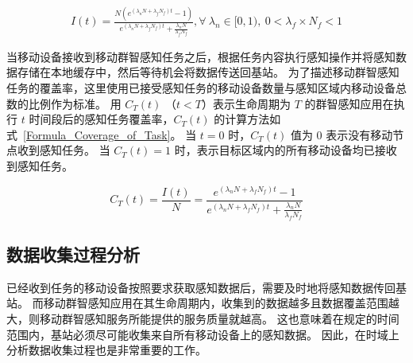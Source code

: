 \begin{equation}
\label{Formula_It_with_fog}
\begin{aligned}
I(t) = \frac{N (e^{(\lambda_n N + \lambda_f N_f) t} - 1)}{e^{(\lambda_n N + \lambda_f N_f) t} + \frac{\lambda_n N}{\lambda_f N_f}}, \forall\ \lambda_n \in [0, 1),\ 0 < \lambda_f \times N_f < 1
\end{aligned}
\end{equation}

当移动设备接收到移动群智感知任务之后，根据任务内容执行感知操作并将感知数据存储在本地缓存中，然后等待机会将数据传送回基站。
为了描述移动群智感知任务的覆盖率，这里使用已接受感知任务的移动设备数量与感知区域内移动设备总数的比例作为标准。
用 $C_T(t)$ （$t < T$）表示生命周期为 $T$ 的群智感知应用在执行 $t$ 时间段后的感知任务覆盖率，$C_T(t)$ 的计算方法如式~\eqref{Formula_Coverage_of_Task}。
当 $t=0$ 时，$C_T(t)$ 值为 0 表示没有移动节点收到感知任务。
当 $C_T(t) = 1$ 时，表示目标区域内的所有移动设备均已接收到感知任务。

\begin{equation}
  \label{Formula_Coverage_of_Task}
  C_T(t) = \frac{I(t)}{N} = \frac{e^{(\lambda_n N + \lambda_f N_f) t} - 1}{e^{(\lambda_n N + \lambda_f N_f) t} + \frac{\lambda_n N}{\lambda_f N_f}}
\end{equation}

\subsection{数据收集过程分析}


已经收到任务的移动设备按照要求获取感知数据后，需要及时地将感知数据传回基站。
而移动群智感知应用在其生命周期内，收集到的数据越多且数据覆盖范围越大，则移动群智感知服务所能提供的服务质量就越高。
这也意味着在规定的时间范围内，基站必须尽可能收集来自所有移动设备上的感知数据。
因此，在时域上分析数据收集过程也是非常重要的工作。

